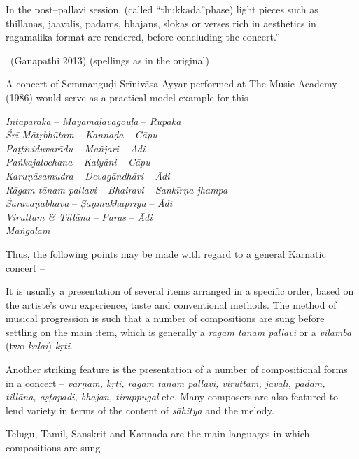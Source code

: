 \begin{myquote}
In the post–pallavi session, (called “thukkada”phase) light pieces such as thillanas, jaavalis, padams, bhajans, slokas or verses rich in aesthetics in ragamalika format are rendered, before concluding the concert.” 

~\hfill (Ganapathi 2013) (spellings as in the original)
\end{myquote}

A concert of Semmanguḍi Srīnivāsa Ayyar performed at The Music Academy (1986) would serve as a practical model example for this –

\textit{Intaparāka} – \textit{Māyāmāḷavagouḷa} – \textit{Rūpaka}\\\textit{Śrī Mātṛbhūtam} – \textit{Kannaḍa} – \textit{Cāpu}\\\textit{Paṭṭividuvarādu} – \textit{Mañjari} – \textit{Ādi}\\\textit{Paṅkajalochana} – \textit{Kalyāni} – \textit{Cāpu} \\\textit{Karuṇāsamudra} – \textit{Devagāndhāri} – \textit{Ādi} \\\textit{Rāgam tānam pallavi} – \textit{Bhairavi} – \textit{Sankīrṇa jhampa}\\\textit{Śaravaṇabhava} – \textit{Ṣaṇmukhapriya} – \textit{Ādi}\\\textit{Viruttam \& Tillāna} – \textit{Paras} – \textit{Ādi} \\\textit{Maṅgalam}

Thus, the following points may be made with regard to a general Karnatic concert –

\item It is usually a presentation of several items arranged in a specific order, based on the artiste’s own experience, taste and conventional methods. The method of musical progression is such that a number of compositions are sung before settling on the main item, which is generally a \textit{rāgam tānam pallavi} or a \textit{viḷamba} (two \textit{kaḷai}) \textit{kṛti}.

 \item Another striking feature is the presentation of a number of compositional forms in a concert – \textit{varṇam, kṛti, rāgam tānam pallavi, viruttam, jāvaḷi, padam, tillāna, aṣṭapadi, bhajan, tiruppugaḻ} etc. Many composers are also featured to lend variety in terms of the content of \textit{sāhitya} and the melody.

 \item Telugu, Tamil, Sanskrit and Kannada are the main languages in which compositions are sung

